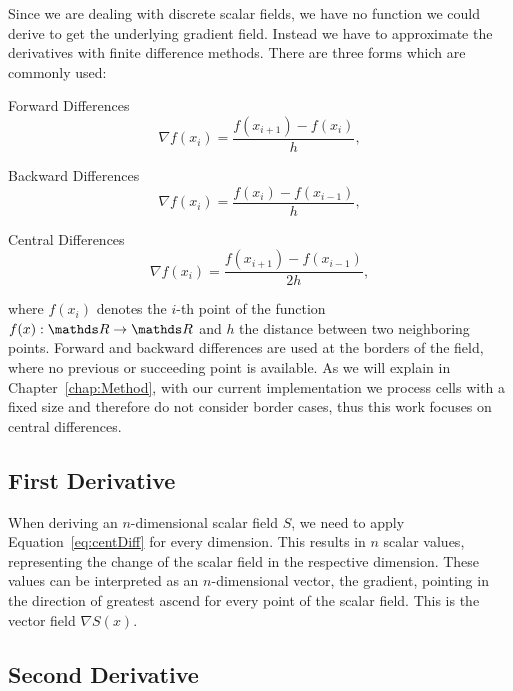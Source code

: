 Since we are dealing with discrete scalar fields, we have no function we
could derive to get the underlying gradient field. Instead we have to
approximate the derivatives with finite difference methods. There are
three forms which are commonly used:\\
\begin{inparaenum}[(a)]
  \item Forward Differences
  \begin{equation}
    \nabla f(x_i) = \frac{f(x_{i+1}) - f(x_i)}{h},
  \end{equation}
  \item Backward Differences
  \begin{equation}
    \nabla f(x_i) = \frac{f(x_i) - f(x_{i-1})}{h},
  \end{equation}
  \item Central Differences
  \begin{equation}\label{eq:centDiff}
    \nabla f(x_i) = \frac{f(x_{i+1}) - f(x_{i-1})}{2h},
  \end{equation}
\end{inparaenum}
where $f(x_i)$ denotes the $i$-th point of the function $f(x): \real
\rightarrow \real$ and $h$ the distance between two neighboring points.
Forward and backward differences are used at the borders of the field,
where no previous or succeeding point is available. As we will explain
in Chapter~\ref{chap:Method}, with our current implementation we process
cells with a fixed size and therefore do not consider border cases, thus
this work focuses on central differences.

\subsection{First Derivative}

When deriving an $n$-dimensional scalar field $S$, we need to apply
Equation~\ref{eq:centDiff} for every dimension. This results in $n$
scalar values, representing the change of the scalar field in the
respective dimension. These values can be interpreted as an
$n$-dimensional vector, the gradient, pointing in the direction of
greatest ascend for every point of the scalar field. This is the
vector field $\nabla S(x)$.

\subsection{Second Derivative}


